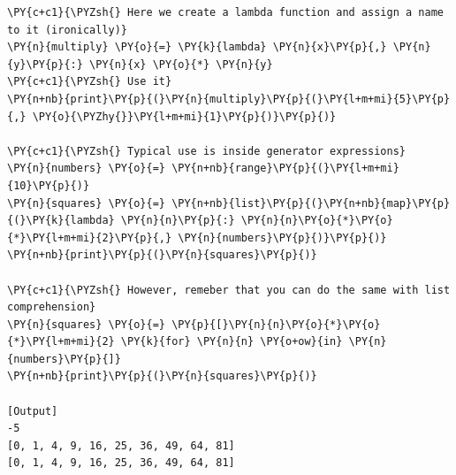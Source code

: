 \begin{Verbatim}[label=\makebox{\url{https://github.com/lucabaldini/cmepda/tree/master/slides/latex/snippets/lambda.py}},commandchars=\\\{\}]
\PY{c+c1}{\PYZsh{} Here we create a lambda function and assign a name to it (ironically)}
\PY{n}{multiply} \PY{o}{=} \PY{k}{lambda} \PY{n}{x}\PY{p}{,} \PY{n}{y}\PY{p}{:} \PY{n}{x} \PY{o}{*} \PY{n}{y}
\PY{c+c1}{\PYZsh{} Use it}
\PY{n+nb}{print}\PY{p}{(}\PY{n}{multiply}\PY{p}{(}\PY{l+m+mi}{5}\PY{p}{,} \PY{o}{\PYZhy{}}\PY{l+m+mi}{1}\PY{p}{)}\PY{p}{)}

\PY{c+c1}{\PYZsh{} Typical use is inside generator expressions}
\PY{n}{numbers} \PY{o}{=} \PY{n+nb}{range}\PY{p}{(}\PY{l+m+mi}{10}\PY{p}{)}
\PY{n}{squares} \PY{o}{=} \PY{n+nb}{list}\PY{p}{(}\PY{n+nb}{map}\PY{p}{(}\PY{k}{lambda} \PY{n}{n}\PY{p}{:} \PY{n}{n}\PY{o}{*}\PY{o}{*}\PY{l+m+mi}{2}\PY{p}{,} \PY{n}{numbers}\PY{p}{)}\PY{p}{)}
\PY{n+nb}{print}\PY{p}{(}\PY{n}{squares}\PY{p}{)}

\PY{c+c1}{\PYZsh{} However, remeber that you can do the same with list comprehension}
\PY{n}{squares} \PY{o}{=} \PY{p}{[}\PY{n}{n}\PY{o}{*}\PY{o}{*}\PY{l+m+mi}{2} \PY{k}{for} \PY{n}{n} \PY{o+ow}{in} \PY{n}{numbers}\PY{p}{]}
\PY{n+nb}{print}\PY{p}{(}\PY{n}{squares}\PY{p}{)}

[Output]
-5
[0, 1, 4, 9, 16, 25, 36, 49, 64, 81]
[0, 1, 4, 9, 16, 25, 36, 49, 64, 81]
\end{Verbatim}